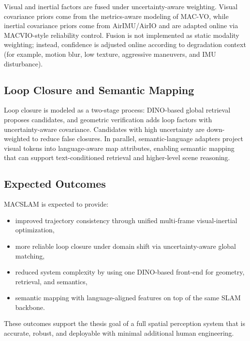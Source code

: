 Visual and inertial factors are fused under uncertainty-aware weighting.
Visual covariance priors come from the metrics-aware modeling of MAC-VO, while inertial covariance priors come from AirIMU/AirIO and are adapted online via MACVIO-style reliability control.
Fusion is not implemented as static modality weighting; instead, confidence is adjusted online according to degradation context (for example, motion blur, low texture, aggressive maneuvers, and IMU disturbance).

\subsection{Loop Closure and Semantic Mapping}

Loop closure is modeled as a two-stage process: DINO-based global retrieval proposes candidates, and geometric verification adds loop factors with uncertainty-aware covariance.
Candidates with high uncertainty are down-weighted to reduce false closures.
In parallel, semantic-language adapters project visual tokens into language-aware map attributes, enabling semantic mapping that can support text-conditioned retrieval and higher-level scene reasoning.

\subsection{Expected Outcomes}

MACSLAM is expected to provide:
\begin{itemize}
    \item improved trajectory consistency through unified multi-frame visual-inertial optimization,
    \item more reliable loop closure under domain shift via uncertainty-aware global matching,
    \item reduced system complexity by using one DINO-based front-end for geometry, retrieval, and semantics,
    \item semantic mapping with language-aligned features on top of the same SLAM backbone.
\end{itemize}
These outcomes support the thesis goal of a full spatial perception system that is accurate, robust, and deployable with minimal additional human engineering.